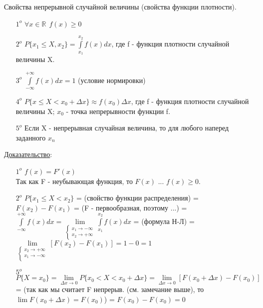 Свойства непрерывной случайной величины (свойства функции плотности).
\begin{enumerate}
	\item[$1^o$]
	$\forall x \in \mathbb{R} \ \ f(x) \geqslant 0$ \\
	
	\item[$2^o$]
	$P\{x_1 \leqslant X , x_2\} = \int\limits_{x_1}^{x_2} f(x)dx$, где f - функция плотности случайной величины X.
	
	\item[$3^o$]
	$\displaystyle \int\limits_{-\infty}^{+\infty} f(x)dx = 1$ (условие нормировки) %
	
	\item[$4^o$]
	$P\{x \leqslant X < x_0 + \Delta x\} \approx f(x_0) \Delta x$, где f - функция плотности случайной величины X; $x_0$ - точка непрерывности функции f.
	
	\item[$5^o$]
	Если X - непрерывная случайная величина, то для любого наперед заданного $x_n$ 
\end{enumerate}

\underline{Доказательство}:
\begin{enumerate}
	\item[$1^o$]
	$f(x) = F'(x)$ \\
	Так как F - неубывающая функция, то $F(x)$ ... $f(x) \geqslant 0$.
	
	\item[$2^o$]
	$P\{x_1 \leqslant X < x_2\}$ = (свойство функции распределения) = $F(x_2) - F(x_1)$ = (F - первообразная, поэтому ...) = $\displaystyle \int\limits_{-\infty}^{+\infty} f(x) dx = 
	\lim\limits_{
		\begin{cases}
			x_1 \to -\infty \\ 
			x_2 \to +\infty 
		\end{cases}} 
	\int\limits_{x_1}^{x_2} f(x)dx$ = (формула Н-Л) = 
	$\lim\limits_{
		\begin{cases}
			x_2 \to +\infty \\
			x_1 \to -\infty \\
		\end{cases}}
	\left[F(x_2) - F(x_1)\right] = 1 - 0 = 1$
	
	\item[$5^o$]
	$P\{X = x_0\} = \lim\limits_{\Delta x \to 0} P\{x_0 < X < x_0 + \Delta x\} = \lim\limits_{\Delta x \to 0} \left[F(x_0 + \Delta x) - F(x_0)\right]$ = (так как мы считает F непрерыв. (см. замечание выше), то $\lim\limits F(x_0 + \Delta x) = F(x_0)$) = $F(x_0) - F(x_0) = 0$
\end{enumerate}


